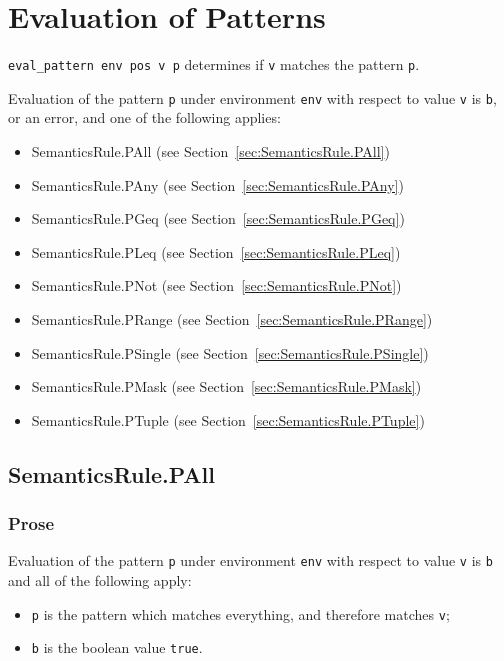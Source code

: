 \documentclass{book}
\begin{document}

\chapter{Evaluation of Patterns \label{chap:eval_pattern}}

\texttt{eval\_pattern env pos v p} determines if \texttt{v} matches the pattern \texttt{p}.

Evaluation of the pattern \texttt{p} under environment \texttt{env} with
respect to value \texttt{v} is \texttt{b}, or an error, and one of the
following applies:
\begin{itemize}
\item SemanticsRule.PAll (see Section~\ref{sec:SemanticsRule.PAll})
\item SemanticsRule.PAny (see Section~\ref{sec:SemanticsRule.PAny})
\item SemanticsRule.PGeq (see Section~\ref{sec:SemanticsRule.PGeq})
\item SemanticsRule.PLeq (see Section~\ref{sec:SemanticsRule.PLeq})
\item SemanticsRule.PNot (see Section~\ref{sec:SemanticsRule.PNot})
\item SemanticsRule.PRange (see Section~\ref{sec:SemanticsRule.PRange})
\item SemanticsRule.PSingle (see Section~\ref{sec:SemanticsRule.PSingle})
\item SemanticsRule.PMask (see Section~\ref{sec:SemanticsRule.PMask})
\item SemanticsRule.PTuple (see Section~\ref{sec:SemanticsRule.PTuple})
\end{itemize}

\section{SemanticsRule.PAll \label{sec:SemanticsRule.PAll}}

  \subsection{Prose}
  Evaluation of the pattern \texttt{p} under environment \texttt{env} with
  respect to value \texttt{v} is \texttt{b} and all of the following apply:
  \begin{itemize}
    \item \texttt{p} is the pattern which matches everything, and therefore
      matches \texttt{v};
    \item \texttt{b} is the boolean value \texttt{true}.
  \end{itemize}
\end{document}
